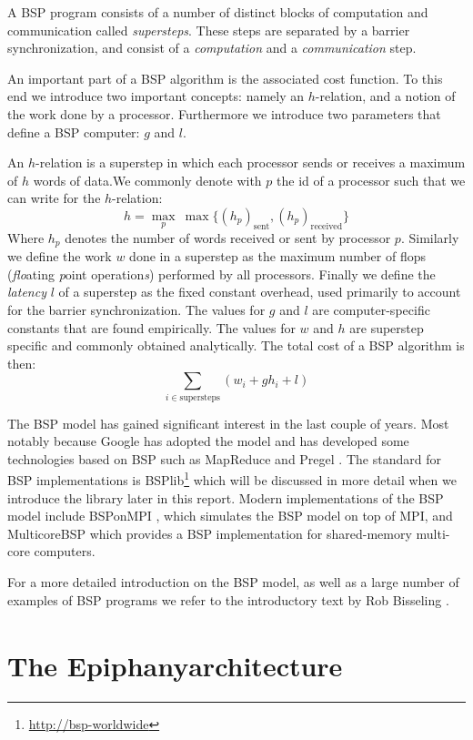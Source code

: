 \documentclass[fleqn]{article}
\renewcommand{\(}{\left(}
\renewcommand{\)}{\right)}
\newcommand{\tm}{\textsuperscript{\texttrademark}}
\begin{document}
A BSP program consists of a number of distinct blocks of computation and communication called \emph{supersteps}. These steps are separated by a barrier synchronization, and consist of a \emph{computation} and a \emph{communication} step.

An important part of a BSP algorithm is the associated cost function. To this end we introduce two important concepts: namely an $h$-relation, and a notion of the work done by a processor. Furthermore we introduce two parameters that define a BSP computer: $g$ and $l$.

An $h$-relation is a superstep in which each processor sends or receives a maximum of $h$ words of data.We commonly denote with $p$ the id of a processor such that we can write for the $h$-relation:
$$h = \max_{p} ~ \max \{ (h_p)_\text{sent} ,  (h_p)_\text{received} \}$$
Where $h_p$ denotes the number of words received or sent by processor $p$. Similarly we define the work $w$ done in a superstep as the maximum number of flops (\emph{flo}ating \emph{p}oint operation\emph{s})  performed by all processors. Finally we define the \emph{latency} $l$ of a superstep as the fixed constant overhead, used primarily to account for the barrier synchronization. The values for $g$ and $l$ are computer-specific constants that are found empirically. The values for $w$ and $h$ are superstep specific and commonly obtained analytically. The total cost of a BSP algorithm is then:
$$ \sum_{i \in \text{supersteps}} \( w_i + g h_i + l \)$$

The BSP model has gained significant interest in the last couple of years. Most notably because Google has adopted the model and has developed some technologies based on BSP such as MapReduce \cite{goo:mapreduce} and Pregel \cite{goo:pregel}. The standard for BSP implementations is BSPlib\footnote{\url{http://bsp-worldwide}} which will be discussed in more detail when we introduce the library later in this report. Modern implementations of the BSP model include BSPonMPI \cite{bsponmpi}, which simulates the BSP model on top of MPI, and MulticoreBSP \cite{multicorebsp} which provides a BSP implementation for shared-memory multi-core computers.

For a more detailed introduction on the BSP model, as well as a large number of examples of BSP programs we refer to the introductory text by Rob Bisseling \cite{bsp:bisseling}.

\section{The Epiphany\tm architecture}
\end{document}
